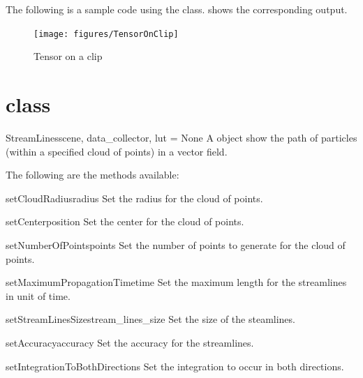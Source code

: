 The following is a sample code using the \TensorOnClip class.
 shows the corresponding output.


\begin{figure}[ht]
\begin{center}
\texttt{[image: figures/TensorOnClip]}
\end{center}
\caption{Tensor on a clip}
\label{fig:tensoronclip.1}
\end{figure}

\section{\StreamLines class}
\begin{classdesc}{StreamLines}{scene, data_collector, lut = None}
A \StreamLines object show the path of particles (within a specified cloud 
of points) in a vector field.
\end{classdesc}

The following are the methods available:
\begin{methoddesc}[StreamLines]{setCloudRadius}{radius}
Set the radius for the cloud of points.
\end{methoddesc}

\begin{methoddesc}[StreamLines]{setCenter}{position}
Set the center for the cloud of points.
\end{methoddesc}

\begin{methoddesc}[StreamLines]{setNumberOfPoints}{points}
Set the number of points to generate for the cloud of points.
\end{methoddesc}

\begin{methoddesc}[StreamLines]{setMaximumPropagationTime}{time}
Set the maximum length for the streamlines in unit of time.
\end{methoddesc}

\begin{methoddesc}[StreamLines]{setStreamLinesSize}{stream_lines_size}
Set the size of the steamlines.
\end{methoddesc}

\begin{methoddesc}[StreamLines]{setAccuracy}{accuracy}
Set the accuracy for the streamlines.
\end{methoddesc}

\begin{methoddesc}[StreamLines]{setIntegrationToBothDirections}{}
Set the integration to occur in both directions.
\end{methoddesc}


